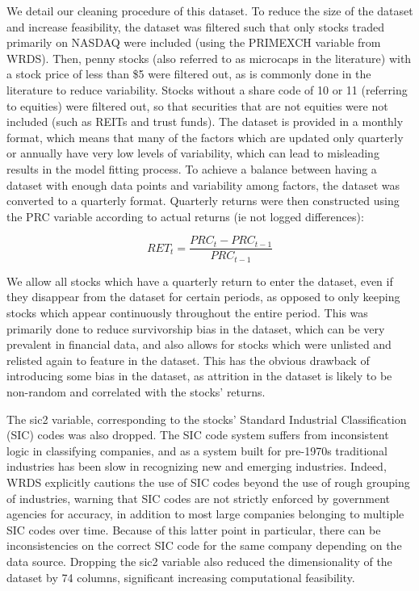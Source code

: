 \documentclass[11pt, a4paper, table]{article}
\begin{document}

We detail our cleaning procedure of this dataset. To reduce the size of the dataset and increase feasibility, the dataset was filtered such that only stocks traded primarily on NASDAQ were included (using the PRIMEXCH variable from WRDS). Then, penny stocks (also referred to as microcaps in the literature) with a stock price of less than \$5 were filtered out, as is commonly done in the literature to reduce variability. Stocks without a share code of 10 or 11 (referring to equities) were filtered out, so that securities that are not equities were not included (such as REITs and trust funds). The dataset is provided in a monthly format, which means that many of the factors which are updated only quarterly or annually have very low levels of variability, which can lead to misleading results in the model fitting process. To achieve a balance between having a dataset with enough data points and variability among factors, the dataset was converted to a quarterly format. Quarterly returns were then constructed using the PRC variable according to actual returns (ie not logged differences):

\begin{equation}
	RET_t = \frac{PRC_t - PRC_{t-1}}{PRC_{t-1}}
\end{equation}

We allow all stocks which have a quarterly return to enter the dataset, even if they disappear from the dataset for certain periods, as opposed to only keeping stocks which appear continuously throughout the entire period. This was primarily done to reduce survivorship bias in the dataset, which can be very prevalent in financial data, and also allows for stocks which were unlisted and relisted again to feature in the dataset. This has the obvious drawback of introducing some bias in the dataset, as attrition in the dataset is likely to be non-random and correlated with the stocks' returns. 

The sic2 variable, corresponding to the stocks' Standard Industrial Classification (SIC) codes was also dropped. The SIC code system suffers from inconsistent logic in classifying companies, and as a system built for pre-1970s traditional industries has been slow in recognizing new and emerging industries. Indeed, WRDS explicitly cautions the use of SIC codes beyond the use of rough grouping of industries, warning that SIC codes are not strictly enforced by government agencies for accuracy, in addition to most large companies belonging to multiple SIC codes over time. Because of this latter point in particular, there can be inconsistencies on the correct SIC code for the same company depending on the data source. Dropping the sic2 variable also reduced the dimensionality of the dataset by 74 columns, significant increasing computational feasibility.
\end{document}
